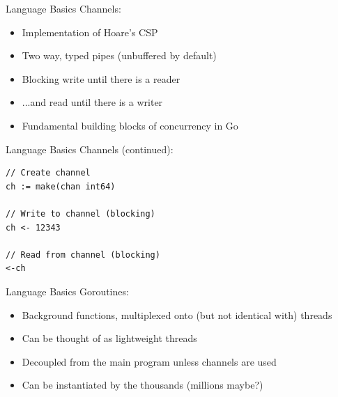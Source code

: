 \documentclass[pdf,xcolor=dvipsnames,noparindent]{beamer}
\begin{document}
\begin{frame}[fragile]{Language Basics}
  Channels:
  \pause
  \begin{itemize}
  \item Implementation of Hoare's CSP
    \pause
  \item Two way, typed pipes (unbuffered by default)
    \pause
  \item Blocking write until there is a reader
    \pause
  \item ...and read until there is a writer
    \pause
  \item Fundamental building blocks of concurrency in Go
  \end{itemize}
  
\end{frame}

\begin{frame}[fragile]{Language Basics}
  Channels (continued):
  \pause
\begin{verbatim}
// Create channel
ch := make(chan int64)

// Write to channel (blocking)
ch <- 12343

// Read from channel (blocking)
<-ch
\end{verbatim}
\end{frame}

\begin{frame}[fragile]{Language Basics}
  Goroutines:
  \pause
  \begin{itemize}
  \item Background functions, multiplexed onto (but not identical with) threads
    \pause
  \item Can be thought of as lightweight threads
    \pause
  \item Decoupled from the main program unless channels are used
    \pause
  \item Can be instantiated by the thousands (millions maybe?)
  \end{itemize}
\end{frame}

\end{document}

